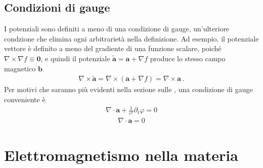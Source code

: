 \documentclass[letterpaper,10pt,italian]{jupyterBook}
\begin{document}
\section{Condizioni di gauge}
\label{\detokenize{ch/potentials:condizioni-di-gauge}}
\sphinxAtStartPar
I potenziali sono definiti a meno di una condizione di gauge, un’ulteriore condzione che elimina ogni arbitrarietà nella definizione.
Ad esempio, il potenziale vettore è definito a meno del gradiente di una funzione scalare, poiché \(\nabla \times \nabla f \equiv \mathbf{0}\), e quindi il potenziale \(\tilde{\mathbf{a}} = \mathbf{a} + \nabla f\) produce lo stesso campo magnetico \(\mathbf{b}\)
\begin{equation*}
\begin{split}\nabla \times \tilde{\mathbf{a}} = \nabla \times (\mathbf{a} + \nabla f) = \nabla \times \mathbf{a} \ .\end{split}
\end{equation*}
\sphinxAtStartPar
{} Per motivi che saranno più evidenti nella sezione sulle {\hyperref[\detokenize{ch/waves:classical-electromagnetism-waves}]{}}, una condizione di gauge conveniente è
\begin{equation*}
\begin{split}\nabla \cdot \mathbf{a} + \frac{1}{c^2} \partial_t \varphi = 0\end{split}
\end{equation*}
\sphinxAtStartPar
{}
\begin{equation*}
\begin{split}\nabla \cdot \mathbf{a} = 0\end{split}
\end{equation*}
\sphinxstepscope




\chapter{Elettromagnetismo nella materia}
\label{\detokenize{ch/media:elettromagnetismo-nella-materia}}\label{\detokenize{ch/media:classical-electromagnetism-media}}\label{\detokenize{ch/media::doc}}
\sphinxAtStartPar
{}
\end{document}
